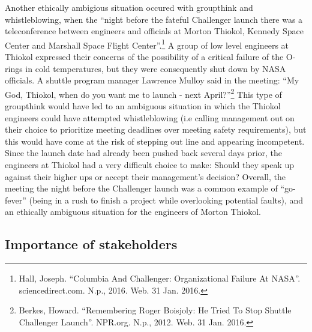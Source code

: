 \documentclass{article}
\newcommand{\q}[1]{``#1''}
\begin{document}
Another ethically ambigious situation occured with groupthink and whistleblowing, when the \q{night before the fateful Challenger launch there was a teleconference between engineers and officials at Morton Thiokol, Kennedy Space Center and Marshall Space Flight Center}.\footnote{Hall, Joseph. \q{Columbia And Challenger: Organizational Failure At NASA}. sciencedirect.com. N.p., 2016. Web. 31 Jan. 2016.} A group of low level engineers at Thiokol expressed their concerns of the possibility of a critical failure of the O-rings in cold temperatures, but they were consequently shut down by NASA officials. A shuttle program manager Lawrence Mulloy said in the meeting: \q{My God, Thiokol, when do you want me to launch - next April?}\footnote{Berkes, Howard. \q{Remembering Roger Boisjoly:  He Tried To Stop Shuttle Challenger Launch}. NPR.org. N.p., 2012. Web. 31 Jan. 2016.} This type of groupthink would have led to an ambiguous situation in which the Thiokol engineers could have attempted whistleblowing (i.e calling management out on their choice to prioritize meeting deadlines over meeting safety requirements), but this would have come at the risk of stepping out line and appearing incompetent. Since the launch date had already been pushed back several days prior, the engineers at Thiokol had a very difficult choice to make: Should they speak up against their higher ups or accept their management's decision? Overall, the meeting the night before the Challenger launch was a common example of \q{go-fever} (being in a rush to finish a project while overlooking potential faults), and an ethically ambiguous situation for the engineers of Morton Thiokol.
\par

\subsection{Importance of stakeholders}
\end{document}
